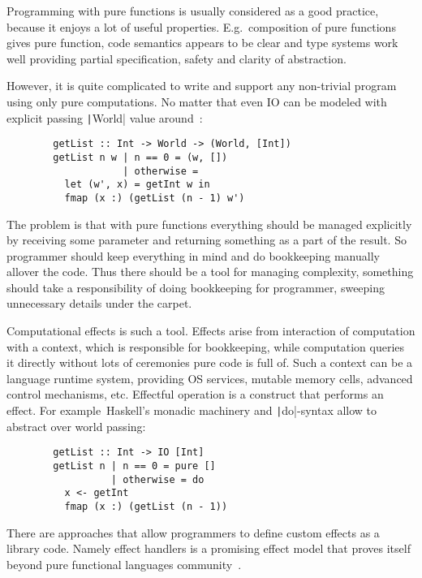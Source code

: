 \documentclass[conference]{IEEEtran}
\begin{document}
    Programming with pure functions is usually considered as a good practice, because it enjoys a lot of useful properties.
    E.g.\ composition of pure functions gives pure function, code semantics appears to be clear and type systems work well providing partial specification, safety and clarity of abstraction.

    However, it is quite complicated to write and support any non-trivial program using only pure computations.
    No matter that even IO can be modeled with explicit passing \texttt|World| value around~\cite{peyton1993imperative}:

    \begin{verbatim}
        getList :: Int -> World -> (World, [Int])
        getList n w | n == 0 = (w, [])
                    | otherwise =
          let (w', x) = getInt w in
          fmap (x :) (getList (n - 1) w')
    \end{verbatim}

    The problem is that with pure functions everything should be managed explicitly by receiving some parameter and returning something as a part of the result.
    So programmer should keep everything in mind and do bookkeeping manually allover the code.
    Thus there should be a tool for managing complexity, something should take a responsibility of doing bookkeeping for programmer, sweeping unnecessary details under the carpet.

    Computational effects is such a tool.
    Effects arise from interaction of computation with a context, which is responsible for bookkeeping, while computation queries it directly without lots of ceremonies pure code is full of.
    Such a context can be a language runtime system, providing OS services, mutable memory cells, advanced control mechanisms, etc.
    Effectful operation is a construct that performs an effect.
    For example\ Haskell's monadic machinery and \texttt|do|-syntax allow to abstract over world passing:

    \begin{verbatim}
        getList :: Int -> IO [Int]
        getList n | n == 0 = pure []
                  | otherwise = do
          x <- getInt
          fmap (x :) (getList (n - 1))
    \end{verbatim}

    There are approaches that allow programmers to define custom effects as a library code.
    Namely effect handlers is a promising effect model that proves itself beyond pure functional languages community~\cite{chandrasekaran2018algebraic}.
\end{document}
